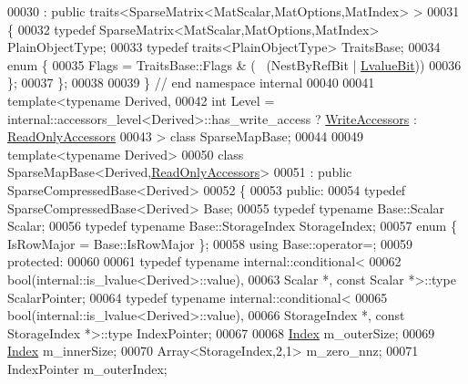 \begin{DoxyCode}
00030   : \textcolor{keyword}{public} traits<SparseMatrix<MatScalar,MatOptions,MatIndex> >
00031 \{
00032   \textcolor{keyword}{typedef} SparseMatrix<MatScalar,MatOptions,MatIndex> PlainObjectType;
00033   \textcolor{keyword}{typedef} traits<PlainObjectType> TraitsBase;
00034   \textcolor{keyword}{enum} \{
00035     Flags = TraitsBase::Flags & (~ (NestByRefBit | \hyperlink{group__flags_gae2c323957f20dfdc6cb8f44428eaec1a}{LvalueBit}))
00036   \};
00037 \};
00038 
00039 \} \textcolor{comment}{// end namespace internal}
00040 
00041 \textcolor{keyword}{template}<\textcolor{keyword}{typename} Derived,
00042          \textcolor{keywordtype}{int} Level = internal::accessors\_level<Derived>::has\_write\_access ? 
      \hyperlink{group__enums_gga9f93eac38eb83deb0e8dbd42ddf11d5da2c59ef3697d65866c3a8e16eda7881ab}{WriteAccessors} : \hyperlink{group__enums_gga9f93eac38eb83deb0e8dbd42ddf11d5da42865f87356ad7e585a1bfbfd1b81699}{ReadOnlyAccessors}
00043 > \textcolor{keyword}{class }SparseMapBase;
00044 
00049 \textcolor{keyword}{template}<\textcolor{keyword}{typename} Derived>
00050 \textcolor{keyword}{class }SparseMapBase<Derived,\hyperlink{group__enums_gga9f93eac38eb83deb0e8dbd42ddf11d5da42865f87356ad7e585a1bfbfd1b81699}{ReadOnlyAccessors}>
00051   : \textcolor{keyword}{public} SparseCompressedBase<Derived>
00052 \{
00053   \textcolor{keyword}{public}:
00054     \textcolor{keyword}{typedef} SparseCompressedBase<Derived> Base;
00055     \textcolor{keyword}{typedef} \textcolor{keyword}{typename} Base::Scalar Scalar;
00056     \textcolor{keyword}{typedef} \textcolor{keyword}{typename} Base::StorageIndex StorageIndex;
00057     \textcolor{keyword}{enum} \{ IsRowMajor = Base::IsRowMajor \};
00058     \textcolor{keyword}{using} Base::operator=;
00059   \textcolor{keyword}{protected}:
00060     
00061     \textcolor{keyword}{typedef} \textcolor{keyword}{typename} internal::conditional<
00062                          bool(internal::is\_lvalue<Derived>::value),
00063                          Scalar *, \textcolor{keyword}{const} Scalar *>::type ScalarPointer;
00064     \textcolor{keyword}{typedef} \textcolor{keyword}{typename} internal::conditional<
00065                          bool(internal::is\_lvalue<Derived>::value),
00066                          StorageIndex *, \textcolor{keyword}{const} StorageIndex *>::type IndexPointer;
00067 
00068     \hyperlink{namespace_eigen_a62e77e0933482dafde8fe197d9a2cfde}{Index}   m\_outerSize;
00069     \hyperlink{namespace_eigen_a62e77e0933482dafde8fe197d9a2cfde}{Index}   m\_innerSize;
00070     Array<StorageIndex,2,1>  m\_zero\_nnz;
00071     IndexPointer  m\_outerIndex;

\end{DoxyCode}
